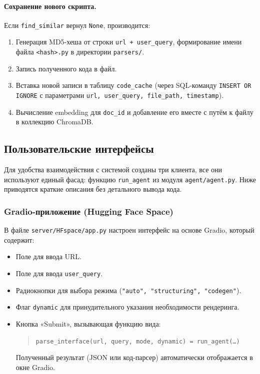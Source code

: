 \paragraph{Сохранение нового скрипта.}
Если \texttt{find\_similar} вернул \texttt{None}, производится:
\begin{enumerate}
    \item Генерация MD5-хеша от строки \texttt{url + user\_query}, формирование имени файла \texttt{<hash>.py} в директории \texttt{parsers/}.
    \item Запись полученного кода в файл.
    \item Вставка новой записи в таблицу \texttt{code\_cache} (через SQL-команду \texttt{INSERT OR IGNORE} с параметрами \texttt{url, user\_query, file\_path, timestamp}).
    \item Вычисление embedding для \texttt{doc\_id} и добавление его вместе с путём к файлу в коллекцию ChromaDB.
\end{enumerate}

\subsection{Пользовательские интерфейсы}
\label{subsec:solution5}

Для удобства взаимодействия с системой созданы три клиента, все они используют единый фасад: функцию \texttt{run\_agent} из модуля \texttt{agent/agent.py}. Ниже приводятся краткие описания без детального вывода кода.

\subsubsection{Gradio-приложение (Hugging Face Space)}

В файле \texttt{server/HFspace/app.py} настроен интерфейс на основе Gradio, который содержит:
\begin{itemize}
    \item Поле для ввода URL.
    \item Поле для ввода \texttt{user\_query}.
    \item Радиокнопки для выбора режима (\texttt{"auto", "structuring", "codegen"}).
    \item Флаг \texttt{dynamic} для принудительного указания необходимости рендеринга.
    \item Кнопка «Submit», вызывающая функцию вида:
    \begin{quote}
      \texttt{parse\_interface(url, query, mode, dynamic) = run\_agent(\dots)}
    \end{quote}
    Полученный результат (JSON или код-парсер) автоматически отображается в окне Gradio.
\end{itemize}

